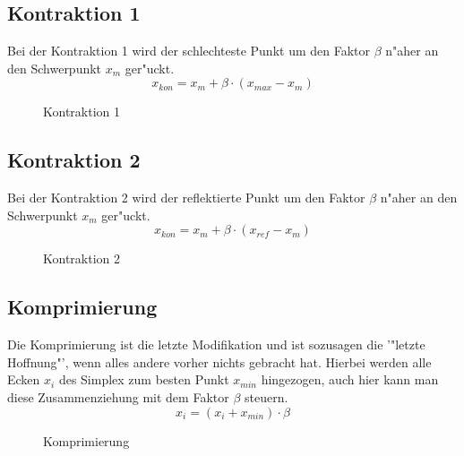 \subsection{Kontraktion 1}
Bei der Kontraktion 1 wird der schlechteste Punkt um den Faktor $\beta$ n"aher an den Schwerpunkt $x_m$ ger"uckt. 
\begin{equation}
x_{kon} = x_{m} + \beta \cdot (x_{max}-x_{m})
\end{equation}

\begin{figure}[h]
	\centering
  	\caption{Kontraktion 1}%
	\label{fig:Kon1}%
\end{figure}

\subsection{Kontraktion 2}
Bei der Kontraktion 2 wird der reflektierte Punkt um den Faktor $\beta$ n"aher an den Schwerpunkt $x_m$ ger"uckt. 
\begin{equation}
x_{kon} = x_{m} + \beta \cdot (x_{ref}-x_{m})
\end{equation}

\begin{figure}[h]
	\centering
  	\caption{Kontraktion 2}%
	\label{fig:Kon2}%
\end{figure}
\newpage
\subsection{Komprimierung}
Die Komprimierung ist die letzte Modifikation und ist sozusagen die '"letzte Hoffnung"', wenn alles andere vorher nichts gebracht hat. Hierbei werden alle Ecken $x_i$ des Simplex zum besten Punkt $x_{min}$ hingezogen, auch hier kann man diese Zusammenziehung mit dem Faktor $\beta$ steuern.  
\begin{equation}
x_{i} = (x_i + x_{min}) \cdot \beta
\end{equation}

\begin{figure}[h]
	\centering
  	\caption{Komprimierung}%
	\label{fig:komp}%
\end{figure}
